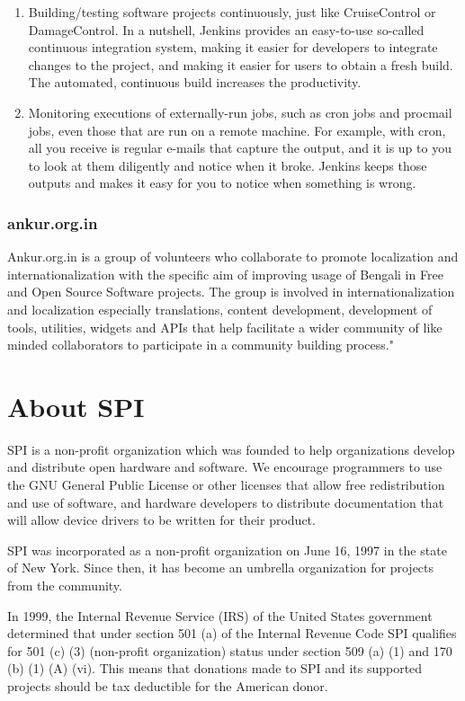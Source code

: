 \documentclass[letterpaper]{report}
\begin{document}
\begin{enumerate}
\item Building/testing software projects continuously, just like CruiseControl
or DamageControl. In a nutshell, Jenkins provides an easy-to-use so-called
continuous integration system, making it easier for developers to integrate
changes to the project, and making it easier for users to obtain a fresh build.
The automated, continuous build increases the productivity.

\item Monitoring executions of externally-run jobs, such as cron jobs and
procmail jobs, even those that are run on a remote machine. For example, with
cron, all you receive is regular e-mails that capture the output, and it is up
to you to look at them diligently and notice when it broke. Jenkins keeps those
outputs and makes it easy for you to notice when something is wrong.
\end{enumerate}

\subsection{ankur.org.in}
Ankur.org.in is a group of volunteers who collaborate to promote localization
and internationalization with the specific aim of improving usage of Bengali in
Free and Open Source Software projects. The group is involved in
internationalization and localization especially translations, content
development, development of tools, utilities, widgets and APIs that help
facilitate a wider community of like minded collaborators to participate in a
community building process."

\appendix
\chapter{About SPI}

SPI is a non-profit organization which was founded to help organizations
develop and distribute open hardware and software. We encourage programmers
to use the GNU General Public License or other licenses that allow free
redistribution and use of software, and hardware developers to distribute
documentation that will allow device drivers to be written for their product.

SPI was incorporated as a non-profit organization on June 16, 1997 in the state
of New York. Since then, it has become an umbrella organization for projects
from the community.

In 1999, the Internal Revenue Service (IRS) of the United States government
determined that under section 501 (a) of the Internal Revenue Code SPI
qualifies for 501 (c) (3) (non-profit organization) status under section 509
(a) (1) and 170 (b) (1) (A) (vi). This means that donations made to SPI and its
supported projects should be tax deductible for the American donor.
\end{document}
